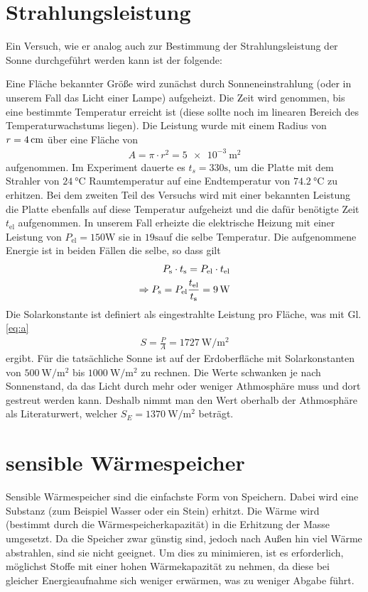 \documentclass[12pt,a4paper,titlepage,headinclude,bibtotoc]{scrartcl}
\begin{document}
\section{Strahlungsleistung}
Ein Versuch, wie er analog auch zur Bestimmung der Strahlungsleistung der Sonne durchgeführt werden kann ist der folgende:

Eine Fläche bekannter Größe wird zunächst durch Sonneneinstrahlung (oder in unserem Fall das Licht einer Lampe) aufgeheizt.
Die Zeit wird genommen, bis eine bestimmte Temperatur erreicht ist (diese sollte noch im linearen Bereich des Temperaturwachstums liegen).
Die Leistung wurde mit einem Radius von $r=\SI4{\centi\meter}$ über eine Fläche von
\begin{align}
	A=\pi\cdot r^2=\SI{5e-3}{\meter\squared}\label{eq:a}
\end{align}
aufgenommen.
Im Experiment dauerte es $t_s=330\si\second$, um die Platte mit dem Strahler von $\SI{24}{\celsius}$ Raumtemperatur auf eine Endtemperatur von $\SI{74.2}{\celsius}$ zu erhitzen.
Bei dem zweiten Teil des Versuchs wird mit einer bekannten Leistung die Platte ebenfalls auf diese Temperatur aufgeheizt und die dafür benötigte Zeit $t_\text{el}$ aufgenommen.
In unserem Fall erheizte die elektrische Heizung mit einer Leistung von $P_\text{el}=150\si\watt$ sie in $19\si\second$auf die selbe Temperatur.
Die aufgenommene Energie ist in beiden Fällen die selbe, so dass gilt
\begin{align*}
	P_\text s\cdot t_\text s=P_\text{el}\cdot t_\text{el}\\
	\Rightarrow P_\text s=P_\text{el}\frac{t_\text{el}}{t_\text s}=\SI9\watt
\end{align*}
Die Solarkonstante ist definiert als eingestrahlte Leistung pro Fläche, was mit Gl. \eqref{eq:a}
\begin{align*}
	S=\frac{P}{A}=\SI{1727}{\watt\per\meter\squared}
\end{align*}
ergibt.
Für die tatsächliche Sonne ist auf der Erdoberfläche mit Solarkonstanten von $\SI{500}{\watt\per\meter\squared}$ bis $\SI{1000}{\watt\per\meter\squared}$ zu rechnen.
Die Werte schwanken je nach Sonnenstand, da das Licht durch mehr oder weniger Athmosphäre muss und dort gestreut werden kann.
Deshalb nimmt man den Wert oberhalb der Athmosphäre als Literaturwert, welcher $S_E=\SI{1370}{\watt\per\meter\squared}$ beträgt.





\section{sensible Wärmespeicher}
Sensible Wärmespeicher sind die einfachste Form von Speichern.
Dabei wird eine Substanz (zum Beispiel Wasser oder ein Stein) erhitzt.
Die Wärme wird (bestimmt durch die Wärmespeicherkapazität) in die Erhitzung der Masse umgesetzt.
Da die Speicher zwar günstig sind, jedoch nach Außen hin viel Wärme abstrahlen, sind sie nicht geeignet.
Um dies zu minimieren, ist es erforderlich, möglichst Stoffe mit einer hohen Wärmekapazität zu nehmen, da diese bei gleicher Energieaufnahme sich weniger erwärmen, was zu weniger Abgabe führt.
\end{document}
